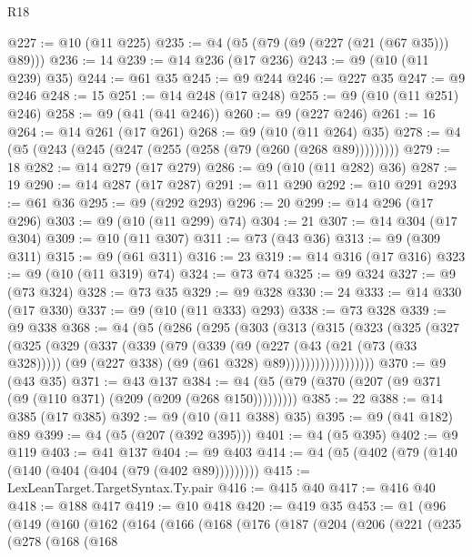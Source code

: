 \begin{lexlean}{R18}
\begin{coremodule}
{{{{{{{{{{{{{{{{{{{{{{{{{{{{{{{{{{{{{{{{{{{{{{{{{{{{{{{{{{{{{{{{{{{{{{{{{{{{{{{{{{{{{{{{{{{{{{{{{{{{{{{{{{{{{@227 := @10 (@11 @225)
@235 := @4 (@5 (@79 (@9 (@227 (@21 (@67 @35))) @89)))
@236 := 14
@239 := @14 @236 (@17 @236)
@243 := @9 (@10 (@11 @239) @35)
@244 := @61 @35
@245 := @9 @244
@246 := @227 @35
@247 := @9 @246
@248 := 15
@251 := @14 @248 (@17 @248)
@255 := @9 (@10 (@11 @251) @246)
@258 := @9 (@41 (@41 @246))
@260 := @9 (@227 @246)
@261 := 16
@264 := @14 @261 (@17 @261)
@268 := @9 (@10 (@11 @264) @35)
@278 := @4 (@5 (@243 (@245 (@247 (@255 (@258 (@79 (@260 (@268 @89)))))))))
@279 := 18
@282 := @14 @279 (@17 @279)
@286 := @9 (@10 (@11 @282) @36)
@287 := 19
@290 := @14 @287 (@17 @287)
@291 := @11 @290
@292 := @10 @291
@293 := @61 @36
@295 := @9 (@292 @293)
@296 := 20
@299 := @14 @296 (@17 @296)
@303 := @9 (@10 (@11 @299) @74)
@304 := 21
@307 := @14 @304 (@17 @304)
@309 := @10 (@11 @307)
@311 := @73 (@43 @36)
@313 := @9 (@309 @311)
@315 := @9 (@61 @311)
@316 := 23
@319 := @14 @316 (@17 @316)
@323 := @9 (@10 (@11 @319) @74)
@324 := @73 @74
@325 := @9 @324
@327 := @9 (@73 @324)
@328 := @73 @35
@329 := @9 @328
@330 := 24
@333 := @14 @330 (@17 @330)
@337 := @9 (@10 (@11 @333) @293)
@338 := @73 @328
@339 := @9 @338
@368 := @4
    (@5
      (@286
        (@295
          (@303
            (@313
              (@315
                (@323
                  (@325
                    (@327
                      (@325
                        (@329
                          (@337
                            (@339
                              (@79
                                (@339
                                  (@9
                                    (@227 (@43 (@21 (@73 (@33 @328)))))
                                    (@9 (@227 @338) (@9 (@61 @328) @89))))))))))))))))))
@370 := @9 (@43 @35)
@371 := @43 @137
@384 := @4 (@5 (@79 (@370 (@207 (@9 @371 (@9 (@110 @371) (@209 (@209 (@268 @150)))))))))
@385 := 22
@388 := @14 @385 (@17 @385)
@392 := @9 (@10 (@11 @388) @35)
@395 := @9 (@41 @182) @89
@399 := @4 (@5 (@207 (@392 @395)))
@401 := @4 (@5 @395)
@402 := @9 @119
@403 := @41 @137
@404 := @9 @403
@414 := @4 (@5 (@402 (@79 (@140 (@140 (@404 (@404 (@79 (@402 @89)))))))))
@415 := LexLeanTarget.TargetSyntax.Ty.pair
@416 := @415 @40
@417 := @416 @40
@418 := @188 @417
@419 := @10 @418
@420 := @419 @35
@453 := @1
    (@96
      (@149
        (@160
          (@162
            (@164
              (@166
                (@168
                  (@176
                    (@187
                      (@204
                        (@206
                          (@221
                            (@235
                              (@278
                                (@168
                                  (@168
}}}}}}}}}}}}}}}}}}}}}}}}}}}}}}}}}}}}}}}}}}}}}}}}}}}}}}}}}}}}}}}}}}}}}}}}}}}}}}}}}}}}}}}}}}}}}}}}}}}}}}}}}}}}}
\end{coremodule}
\end{lexlean}
